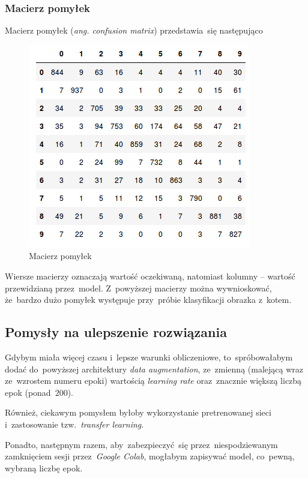 \documentclass[11pt, a4paper]{article}
\begin{document}
\subsubsection{Macierz pomyłek}
Macierz pomyłek (\textit{ang. confusion matrix}) przedstawia~się następująco
\begin{figure}[H]
 \centering
  \includegraphics[scale=1]{confusion_matrix.png}
  \caption{Macierz pomyłek}
\end{figure}
Wiersze macierzy oznaczają wartość oczekiwaną, natomiast kolumny -- wartość przewidzianą przez~model.
Z~powyższej macierzy można wywnioskować, że~bardzo dużo pomyłek występuje przy~próbie klasyfikacji obrazka z~kotem.


\subsection{Pomysły na ulepszenie rozwiązania}
Gdybym miała więcej czasu i~lepsze warunki obliczeniowe, to~spróbowałabym dodać do~powyższej architektury \textit{data augmentation}, ze~zmienną (malejącą wraz ze~wzrostem numeru epoki) wartością \textit{learning rate} oraz~znacznie większą liczbą epok (ponad~$200$).

Również, ciekawym pomysłem byłoby wykorzystanie pretrenowanej sieci i~zastosowanie tzw.~\textit{transfer learning}.

Ponadto, następnym razem, aby~zabezpieczyć~się przez~niespodziewanym zamknięciem sesji przez~\textit{Google Colab}, mogłabym zapisywać model, co~pewną, wybraną liczbę epok.
\end{document}
